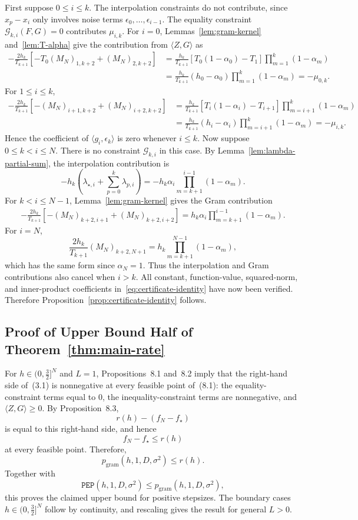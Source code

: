 \documentclass[11pt, hidelinks]{article}
\begin{document}
First suppose $0\le i\le k$. The interpolation constraints do not contribute, since $x_p-x_i$ only involves noise terms $\epsilon_0,\ldots,\epsilon_{i-1}$. The equality constraint $\mathcal G_{k,i}(F,G)=0$ contributes $\mu_{i,k}$. For $i=0$, Lemmas~\ref{lem:gram-kernel} and~\ref{lem:T-alpha} give the contribution from $\langle Z,G\rangle$ as
\[ \begin{aligned}
-\frac{2h_k}{T_{k+1}}\left[-T_0(M_N)_{1,k+2}+(M_N)_{2,k+2}\right]
&=\frac{h_k}{T_{k+1}}\left[T_0(1-\alpha_0)-T_1\right]\prod_{m=1}^{k}(1-\alpha_m)\\
&=\frac{h_k}{T_{k+1}}(h_0-\alpha_0)\prod_{m=1}^{k}(1-\alpha_m)
=-\mu_{0,k}.
\end{aligned} \]
For $1\le i\le k$,
\[ \begin{aligned}
-\frac{2h_k}{T_{k+1}}\left[-(M_N)_{i+1,k+2}+(M_N)_{i+2,k+2}\right]
&=\frac{h_k}{T_{k+1}}\left[T_i(1-\alpha_i)-T_{i+1}\right]\prod_{m=i+1}^{k}(1-\alpha_m)\\
&=\frac{h_k}{T_{k+1}}(h_i-\alpha_i)\prod_{m=i+1}^{k}(1-\alpha_m)
=-\mu_{i,k}.
\end{aligned} \]
Hence the coefficient of $\langle g_i,\epsilon_k\rangle$ is zero whenever $i\le k$.
Now suppose $0\le k<i\le N$. There is no constraint $\mathcal G_{k,i}$ in this case. By Lemma~\ref{lem:lambda-partial-sum}, the interpolation contribution is
\[ -h_k\left(\lambda_{\star,i}+\sum_{p=0}^{k}\lambda_{p,i}\right)
=-h_k\alpha_i\prod_{m=k+1}^{i-1}(1-\alpha_m). \]
For $k<i\le N-1$, Lemma~\ref{lem:gram-kernel} gives the Gram contribution
\[ \begin{aligned}
-\frac{2h_k}{T_{k+1}}\left[-(M_N)_{k+2,i+1}+(M_N)_{k+2,i+2}\right]
=h_k\alpha_i\prod_{m=k+1}^{i-1}(1-\alpha_m).
\end{aligned} \]
For $i=N$,
\[ \frac{2h_k}{T_{k+1}}(M_N)_{k+2,N+1}
=h_k\prod_{m=k+1}^{N-1}(1-\alpha_m), \]
which has the same form since $\alpha_N=1$. Thus the interpolation and Gram contributions also cancel when $i>k$.
All constant, function-value, squared-norm, and inner-product coefficients in~\eqref{eq:certificate-identity} have now been verified. Therefore Proposition~\ref{prop:certificate-identity} follows.
\subsection{Proof of Upper Bound Half of Theorem~\ref{thm:main-rate}}
For $h\in(0,\frac{3}{2}]^N$ and $L=1$, Propositions~8.1 and~8.2 imply that
the right-hand side of~(3.1) is nonnegative at every feasible point
of~(8.1): the equality-constraint terms equal to 0, the inequality-constraint terms are nonnegative, and $\langle Z,G\rangle\ge0$.
By Proposition~8.3,
\[r(h)-(f_N-f_\star)\]
is equal to this right-hand side, and hence
\[f_N-f_\star\le r(h)\]
at every feasible point. Therefore,
\[p_{\mathrm{gram}}(h,1,D,\sigma^2)\le r(h).\]
Together with
\[\mathtt{PEP}(h,1,D,\sigma^2) \le p_{\mathrm{gram}}(h,1,D,\sigma^2), \]
this proves the claimed upper bound for positive stepsizes.
The boundary cases $h\in(0,\frac{3}{2}]^N$ follow by continuity, and rescaling gives the result for general $L>0$.
\end{document}
